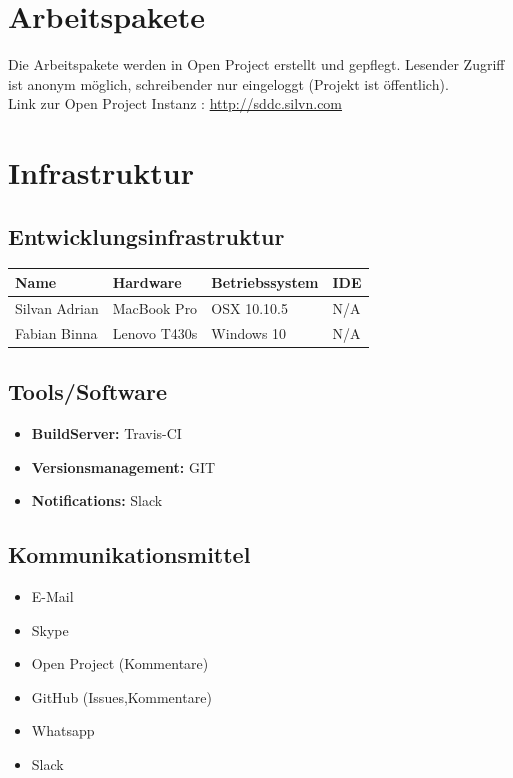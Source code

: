 \documentclass[11pt]{scrartcl}
\begin{document}
\section{Arbeitspakete}

Die Arbeitspakete werden in Open Project erstellt und gepflegt.
Lesender Zugriff ist anonym möglich, schreibender nur eingeloggt (Projekt ist öffentlich). 
\\
Link zur Open Project Instanz : \href{http://sddc.silvn.com}{http://sddc.silvn.com}

\section{Infrastruktur}

\subsection{Entwicklungsinfrastruktur}

\begin{tabularx}{\textwidth}{X X X X}
\textbf{Name} & \textbf{Hardware} & \textbf{Betriebssystem} & \textbf{IDE} \\
\hline
Silvan Adrian & MacBook Pro & OSX 10.10.5 &  N/A \\
\hline
Fabian Binna & Lenovo T430s & Windows 10 &  N/A\\
\hline
\end{tabularx}

\subsection{Tools/Software}
\begin{itemize}
    \item \textbf{BuildServer:} Travis-CI
    \item \textbf{Versionsmanagement:} GIT
    \item \textbf{Notifications:} Slack
\end{itemize}

\subsection{Kommunikationsmittel}
\begin{itemize}
    \item E-Mail
    \item Skype
    \item Open Project (Kommentare)
    \item GitHub (Issues,Kommentare)
    \item Whatsapp
    \item Slack
\end{itemize}
\end{document}

